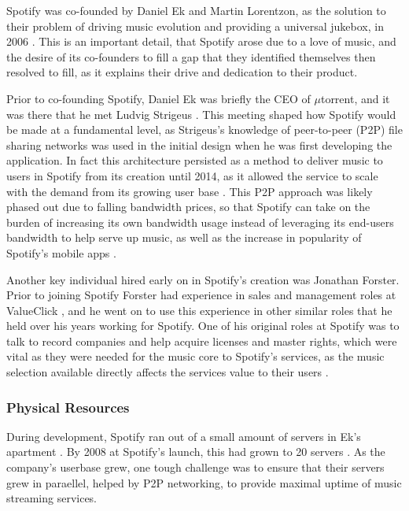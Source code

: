 Spotify was co-founded by Daniel Ek and Martin Lorentzon, as the solution to their problem of driving music evolution and providing a universal jukebox, in 2006 \parencite{ft_spotify}. This is an important detail, that Spotify arose due to a love of music, and the desire of its co-founders to fill a gap that they identified themselves then resolved to fill, as it explains their drive and dedication to their product.
\par
Prior to co-founding Spotify, Daniel Ek was briefly the CEO of $\mu$torrent, and it was there that he met Ludvig Strigeus \parencite{ft_lunch_ek}. This meeting shaped how Spotify would be made at a fundamental level, as Strigeus's knowledge of peer-to-peer (P2P) file sharing networks was used in the initial design when he was first developing the application. In fact this architecture persisted as a method to deliver music to users in Spotify from its creation until 2014, as it allowed the service to scale with the demand from its growing user base \parencite{how_spotify_works, spotify_shut_down_p2p}. This P2P approach was likely phased out due to falling bandwidth prices, so that Spotify can take on the burden of increasing its own bandwidth usage instead of leveraging its end-users bandwidth to help serve up music, as well as the increase in popularity of Spotify's mobile apps \parencite{spotify_shut_down_p2p}.
\par
Another key individual hired early on in Spotify's creation was Jonathan Forster. Prior to joining Spotify Forster had experience in sales and management roles at ValueClick \parencite{forster_linkedin}, and he went on to use this experience in other similar roles that he held over his years working for Spotify. One of his original roles at Spotify was to talk to record companies and help acquire licenses and master rights, which were vital as they were needed for the music core to Spotify's services, as the music selection available directly affects the services value to their users \parencite{jforsterinterview1, jforsterinterview2}.

\subsubsection{Physical Resources}

During development, Spotify ran out of a small amount of servers in Ek's apartment \parencite{JordanCrook2015}. By 2008 at Spotify's launch, this had grown to 20 servers \parencite{Garcia2013}. As the company's userbase grew, one tough challenge was to ensure that their servers grew in paraellel, helped by P2P networking, to provide maximal uptime of music streaming services.

